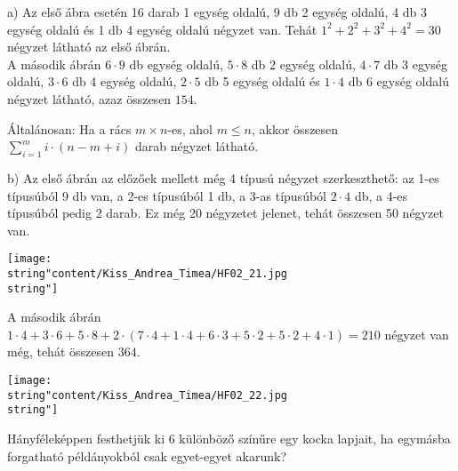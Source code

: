 \begin{solution}
a) Az első ábra esetén 16 darab 1 egység oldalú, 9 db 2 egység oldalú,
4 db 3 egység oldalú és 1 db 4 egység oldalú négyzet van. Tehát $1^{2}+2^{2}+3^{2}+4^{2}=30$
négyzet látható az első ábrán.\\
 A második ábrán $6\cdot9$ db egység oldalú, $5\cdot8$ db 2 egység
oldalú, $4\cdot7$ db 3 egység oldalú, $3\cdot6$ db 4 egység oldalú,
$2\cdot5$ db 5 egység oldalú és $1\cdot4$ db 6 egység oldalú négyzet
látható, azaz összesen $154$.

Általánosan: Ha a rács $m\times n$-es, ahol $m\le n$, akkor összesen
${\displaystyle {\sum_{i=1}^{m}{i\cdot(n-m+i)}}}$ darab négyzet látható.

b) Az első ábrán az előzőek mellett még 4 típusú négyzet szerkeszthető:
az 1-es típusúból 9 db van, a 2-es típusúból 1 db, a 3-as típusúból
$2\cdot4$ db, a 4-es típusúból pedig 2 darab. Ez még 20 négyzetet
jelenet, tehát összesen 50 négyzet van. 
\begin{center}
\texttt{[image: \\string"content/Kiss\_Andrea\_Timea/HF02\_21.jpg\\string"]} 
\par\end{center}
A második ábrán $1\cdot4+3\cdot6+5\cdot8+2\cdot(7\cdot4+1\cdot4+6\cdot3+5\cdot2+5\cdot2+4\cdot1)=210$
négyzet van még, tehát összesen $364$. 
\begin{center}
\texttt{[image: \\string"content/Kiss\_Andrea\_Timea/HF02\_22.jpg\\string"]}
\par\end{center}
\end{solution}
\begin{extraproblem}
Hányféleképpen festhetjük ki 6 különböző színűre egy kocka lapjait,
ha egymásba forgatható példányokból csak egyet-egyet akarunk? 
\end{extraproblem}

